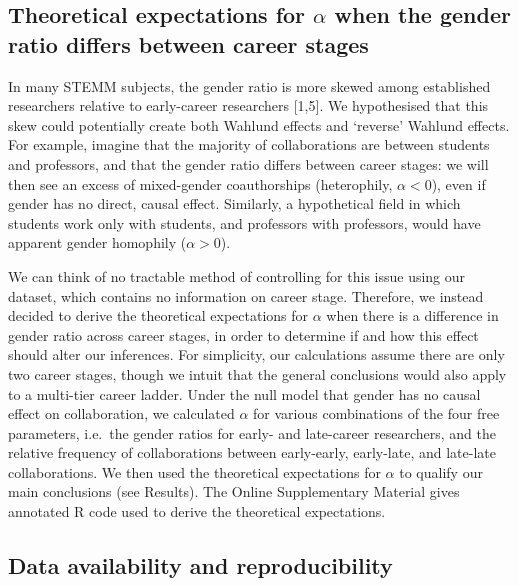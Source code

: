 \documentclass[12pt,]{article}
\begin{document}
\subsection{\texorpdfstring{Theoretical expectations for \(\alpha\) when
the gender ratio differs between career
stages}{Theoretical expectations for \textbackslash{}alpha when the gender ratio differs between career stages}}\label{theoretical-expectations-for-alpha-when-the-gender-ratio-differs-between-career-stages-1}

In many STEMM subjects, the gender ratio is more skewed among
established researchers relative to early-career researchers {[}1,5{]}.
We hypothesised that this skew could potentially create both Wahlund
effects and `reverse' Wahlund effects. For example, imagine that the
majority of collaborations are between students and professors, and that
the gender ratio differs between career stages: we will then see an
excess of mixed-gender coauthorships (heterophily, \(\alpha < 0\)), even
if gender has no direct, causal effect. Similarly, a hypothetical field
in which students work only with students, and professors with
professors, would have apparent gender homophily (\(\alpha > 0\)).

We can think of no tractable method of controlling for this issue using
our dataset, which contains no information on career stage. Therefore,
we instead decided to derive the theoretical expectations for \(\alpha\)
when there is a difference in gender ratio across career stages, in
order to determine if and how this effect should alter our inferences.
For simplicity, our calculations assume there are only two career
stages, though we intuit that the general conclusions would also apply
to a multi-tier career ladder. Under the null model that gender has no
causal effect on collaboration, we calculated \(\alpha\) for various
combinations of the four free parameters, i.e.~the gender ratios for
early- and late-career researchers, and the relative frequency of
collaborations between early-early, early-late, and late-late
collaborations. We then used the theoretical expectations for \(\alpha\)
to qualify our main conclusions (see Results). The Online Supplementary
Material gives annotated R code used to derive the theoretical
expectations.

\subsection{Data availability and
reproducibility}\label{data-availability-and-reproducibility}
\end{document}
